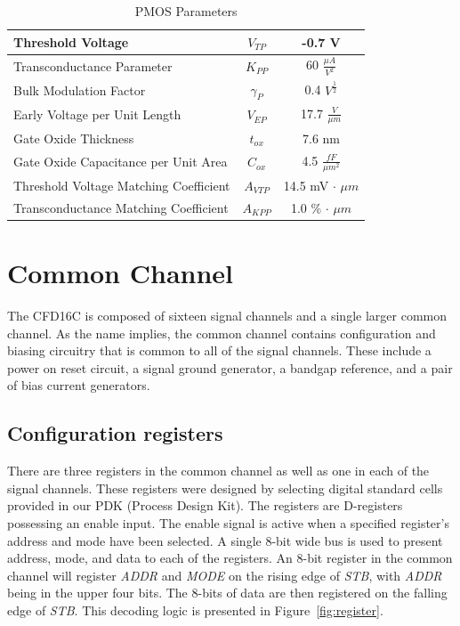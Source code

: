 \documentclass[12pt,oneside,final]{siuethesis}
\theoremstyle{definition}
\begin{document}
 
\begin{table} [htbp!]
\begin{center}
\begin{tabular}{| l | c | c |}
\hline 
Threshold Voltage & $V_{TP}$ & -0.7 V \\ 
\hline 
Transconductance Parameter & $K_{PP}$  &  60 $\frac{\mu A}{V^2}$ \\ 
\hline 
Bulk Modulation Factor & $\gamma_{P}$  &  0.4 $V^{\frac{1}{2}}$ \\ 
\hline 
Early Voltage per Unit Length & $V_{EP}$  &  17.7 $\frac{V}{\mu m}$ \\ 
\hline 
Gate Oxide Thickness & $t_{ox}$  &  7.6 nm \\ 
\hline 
Gate Oxide Capacitance per Unit Area & $C_{ox}$  &  4.5 $\frac{fF}{\mu m^2}$ \\ 
\hline 
Threshold Voltage Matching Coefficient & $A_{VTP}$  &  14.5 mV $\cdot$ $\mu m$ \\ 
\hline 
Transconductance Matching Coefficient & $A_{KPP}$  &  1.0 \% $\cdot$ $\mu m$ \\ 
\hline 
\end{tabular} 
\end{center}
\caption{PMOS Parameters}
\label{TBL:PMOS_PARMS}
\end{table}


\section{Common Channel}
\par The CFD16C is composed of sixteen signal channels and a single larger common channel. As the name implies, the common channel contains configuration and biasing circuitry that is common to all of the signal channels. These include a power on reset circuit, a signal ground generator, a bandgap reference, and a pair of bias current generators.

\subsection{Configuration registers}
\par There are three registers in the common channel as well as one in each of the signal channels. These registers were designed by selecting digital standard cells provided in our PDK (Process Design Kit). The registers are D-registers possessing an enable input. The enable signal is active when a specified register's address and mode have been selected. A single 8-bit wide bus is used to present address, mode, and data to each of the registers. An 8-bit register in the common channel will register \emph{ADDR} and \emph{MODE} on the rising edge of \emph{STB}, with \emph{ADDR} being in the upper four bits. The 8-bits of data are then registered on the falling edge of \emph{STB}. This decoding logic is presented in Figure~\ref{fig:register}.
\end{document}
